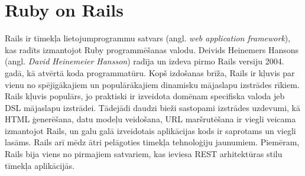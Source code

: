 
\chapter{Ruby on Rails}
Rails ir tīmekļa lietojumprogrammu satvars (angl. \textit{web application framework}), kas radīts izmantojot Ruby programmēšanas valodu. Deivids Heinemers Hansons (angl. \textit{David Heinemeier Hansson}) radīja un izdeva pirmo Rails versiju 2004. gadā, kā atvērtā koda programmatūru. Kopš izdošanas brīža, Rails ir kļuvis par vienu no spējīgākajiem un populārākajiem dinamisku mājaslapu izstrādes rīkiem. Rails kļuvis populārs, jo praktiski ir izveidota domēnam specifiska valoda jeb DSL  mājaslapu izstrādei. Tādejādi daudzi bieži sastopami izstrādes uzdevumi, kā HTML  ģenerēšana, datu modeļu veidošana, URL  maršrutēšana ir viegli veicama izmantojot Rails, un galu galā izveidotais aplikācijas kods ir saprotams un viegli lasāms. Rails arī mēdz ātri pelāgoties timekļa tehnoloģiju jaunumiem. Piemēram, Rails bija viens no pirmajiem satvariem, kas ieviesa REST  arhitektūras stilu tīmekļa aplikācijās.

